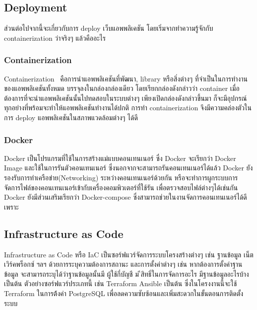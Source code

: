 \subsection{Deployment}
ส่วนต่อไปจากนี้จะเกี่ยวกับการ deploy เว็บแอพพลิเคชัน โดยเริ่มจากทำความรู้จักกับ 
containerization ว่าจริงๆ แล้วคืออะไร
\subsubsection{Containerization}
Containerization~\cite{ctnrh} คือการนำแอพพลิเคชันที่พัฒนา, library หรือสิ่งต่างๆ 
ที่จำเป็นในการทำงานของแอพพลิเคชันทั้งหมด บรรจุลงในกล่องกล่องเดียว โดยเรียกกล่องดังกล่าวว่า container 
เมื่อต้องการที่จะนำแอพพลิเคชันนั้นไปทดสอบในระบบต่างๆ เพียงเปิดกล่องดังกล่าวขึ้นมา
ก็จะมีอุปกรณ์ทุกอย่างที่พร้อมจะทำให้แอพพลิเคชันทำงานได้ปกติ การทำ containerization 
จึงมีความคล่องตัวในการ deploy แอพพลิเคชันในสภาพแวดล้อมต่างๆ ได้ดี 
\subsubsection{Docker}
Docker เป็นโปรแกรมที่ใช้ในการสร้างแม่แบบคอนเทนเนอร์ ซึ่ง Docker จะเรียกว่า Docker Image และใช้ในการรันตัวคอนเทนเนอร์
ซึ่งนอกจากจะสามารถรันคอนเทนเนอร์ได้แล้ว Docker ยังรองรับการทำเครือข่าย(Networking) ระหว่างคอนเทนเนอร์ด้วยกัน 
หรือจะทำการผูกระบบการจัดการไฟล์ของคอนเทนเนอร์เข้ากับเครื่องคอมพิวเตอร์ที่ใช้รัน เพื่อตรวจสอบไฟล์ต่างๆได้เช่นกัน
Docker ยังมีส่วนเสริมเรียกว่า Docker-compose ซึ่งสามารถช่วยในงานจัดการคอนเทนเนอร์ได้ดี เพราะ
\subsection{Infrastructure as Code}
Infrastructure as Code หรือ IaC เป็นซอร์ฟแวร์จัดการระบบโครงสร้างต่างๆ เช่น ฐานข้อมูล เน็ตเวิร์คพร็อกซ์ ฯลฯ 
ด้วยการระบุความต้องการสถานะ และการตั้งค่าต่างๆ เช่น หากต้องการตั้งค่าฐานข้อมูล จะสามารถระบุได้ว่าฐานข้อมูลนั้นมี ผู้ใช้กี่บัญชี ม
ีสิทธิ์ในการจัดการอะไร มีฐานข้อมูลอะไรบ้าง เป็นต้น ตัวอย่างซอร์ฟแวร์ประเภทนี้ เช่น Terraform Ansible เป็นต้น
ซึ่งในโครงงานนี้จะใช้ Terraform ในการต้้งค่า PostgreSQL เพื่อลดความซับซ้อนและเพิ่มสะดวกในขั้นตอนการติดตั้งระบบ

